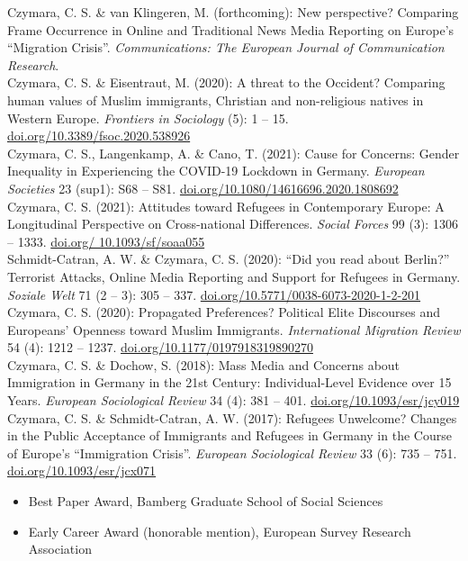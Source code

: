 \documentclass[11pt, a4paper]{article}
\newcommand{\years}[1]{\marginnote{~~#1}}
\begin{document}
\years{9}Czymara, C. S. \& van Klingeren, M. (forthcoming): New perspective? Comparing Frame Occurrence in Online and Traditional News Media Reporting on Europe's ``Migration Crisis''. \textit{Communications: The European Journal of Communication Research}.\\[1em]
\years{8}Czymara, C. S. \& Eisentraut, M. (2020): A threat to the Occident? Comparing human values of Muslim immigrants, Christian and non-religious natives in Western Europe. \textit{Frontiers in Sociology} (5): 1 -- 15. \href{https://doi.org/10.3389/fsoc.2020.538926}{doi.org/10.3389/fsoc.2020.538926}\\[1em]
\years{7}Czymara, C. S., Langenkamp, A. \& Cano, T. (2021): Cause for Concerns: Gender Inequality in Experiencing the \textsc{COVID}-19 Lockdown in Germany. \textit{European Societies} 23 (sup1): S68 -- S81. \href{https://doi.org/10.1080/14616696.2020.1808692}{doi.org/10.1080/14616696.2020.1808692}\\[1em]
\years{6}Czymara, C. S. (2021): Attitudes toward Refugees in Contemporary Europe: A Longitudinal Perspective on Cross-national Differences. \textit{Social Forces} 99 (3): 1306 -- 1333. \href{https://doi.org/10.1093/sf/soaa055}{doi.org/ 10.1093/sf/soaa055}\\[1em]
\years{5}Schmidt-Catran, A. W. \& Czymara, C. S. (2020): ``Did you read about Berlin?'' Terrorist Attacks, Online Media Reporting and Support for Refugees in Germany. \textit{Soziale Welt} 71 (2 -- 3): 305 -- 337. \href{https://doi.org/10.5771/0038-6073-2020-1-2-201}{doi.org/10.5771/0038-6073-2020-1-2-201}\\[1em]
\years{4}Czymara, C. S. (2020): Propagated Preferences? Political Elite Discourses and Europeans' Openness toward Muslim Immigrants. \textit{International Migration Review} 54 (4): 1212 -- 1237. \href{https://doi.org/10.1177/0197918319890270}{doi.org/10.1177/0197918319890270}\\[1em]
\years{3}Czymara, C. S. \& Dochow, S. (2018): Mass Media and Concerns about Immigration in Germany in the 21st Century: Individual-Level Evidence over 15 Years. \textit{European Sociological Review} 34 (4): 381 -- 401. \href{https://doi.org/10.1093/esr/jcy019}{doi.org/10.1093/esr/jcy019}\\[1em]
\years{2}Czymara, C. S. \& Schmidt-Catran, A. W. (2017): Refugees Unwelcome? Changes in the Public Acceptance of Immigrants and Refugees in Germany in the Course of Europe's ``Immigration Crisis''. \textit{European Sociological Review} 33 (6): 735 -- 751. \href{https://doi.org/10.1093/esr/jcx071}{doi.org/10.1093/esr/jcx071}
\begin{itemize}
	\item Best Paper Award, Bamberg Graduate School of Social Sciences
	\item Early Career Award (honorable mention), European Survey Research Association
\end{itemize}
\hspace{1em}
\end{document}
